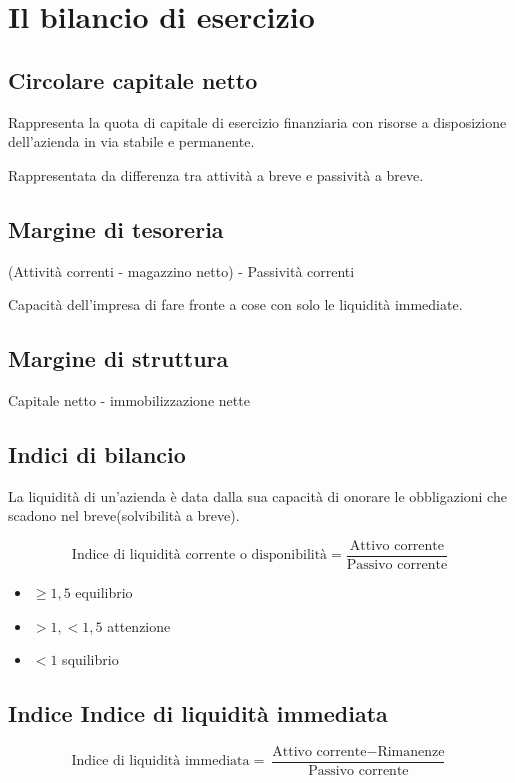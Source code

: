 \section{Il bilancio di esercizio}
\subsection{Circolare capitale netto}
Rappresenta la quota di capitale di esercizio finanziaria con risorse a disposizione dell'azienda in via stabile e permanente.

Rappresentata da differenza tra attività a breve e passività a breve.

\subsection{Margine di tesoreria}
(Attività correnti - magazzino netto) - Passività correnti

Capacità dell'impresa di fare fronte a cose con solo le liquidità immediate.

\subsection{Margine di struttura}
Capitale netto - immobilizzazione nette

\subsection{Indici di bilancio}
La liquidità di un'azienda è data dalla sua capacità di onorare le obbligazioni che scadono nel breve(solvibilità a breve).

\begin{equation*}
    \text{Indice di liquidità corrente o disponibilità} = \frac{\text{Attivo corrente}}{\text{Passivo corrente}}
\end{equation*}

\begin{itemize}
    \item $\geq 1,5$ equilibrio
    \item $> 1, < 1,5$ attenzione
    \item $< 1$ squilibrio
\end{itemize}

\subsection{Indice Indice di liquidità immediata}
\begin{equation*}
    \text{Indice di liquidità immediata} = \frac{\text{Attivo corrente} - \text{Rimanenze}}{\text{Passivo corrente}}
\end{equation*}

